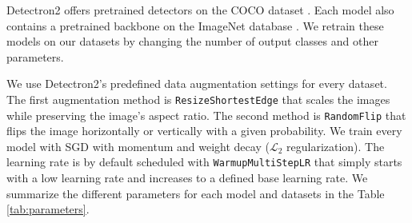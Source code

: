 Detectron2 offers pretrained detectors on the COCO dataset \cite{coco}. Each
model also contains a pretrained backbone on the ImageNet database
\cite{imagenet}. We retrain these models on our datasets by changing the number
of output classes and other parameters.

We use Detectron2's predefined data augmentation settings for every dataset. The
first augmentation method is \texttt{ResizeShortestEdge} that scales the images
while preserving the image's aspect ratio. The second method is
\texttt{RandomFlip} that flips the image horizontally or vertically with a given
probability. We train every model with SGD with momentum and weight decay
($\mathcal{L}_2$ regularization). The learning rate is by default scheduled with
\texttt{WarmupMultiStepLR} that simply starts with a low learning rate and
increases to a defined base learning rate. We summarize the different parameters
for each model and datasets in the Table \ref{tab:parameters}.


